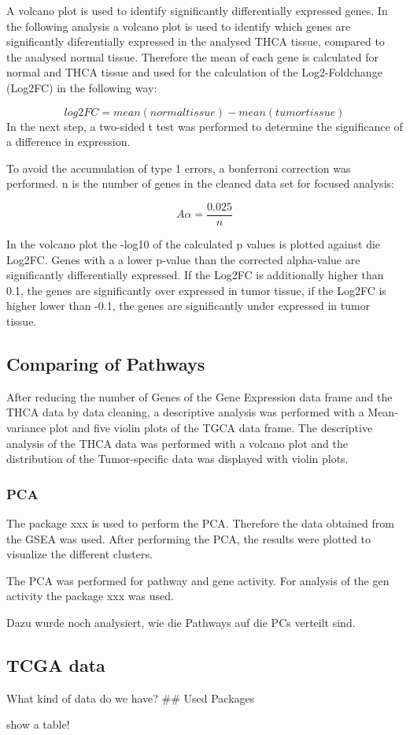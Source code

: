 \documentclass[
]{article}
\begin{document}
A volcano plot is used to identify significantly differentially
expressed genes. In the following analysis a volcano plot is used to
identify which genes are significantly diferentially expressed in the
analysed THCA tissue, compared to the analysed normal tissue. Therefore
the mean of each gene is calculated for normal and THCA tissue and used
for the calculation of the Log2-Foldchange (Log2FC) in the following
way:

\[
log2FC = mean(normal tissue) - mean(tumor tissue)
\] In the next step, a two-sided t test was performed to determine the
significance of a difference in expression.

To avoid the accumulation of type 1 errors, a bonferroni correction was
performed. n is the number of genes in the cleaned data set for focused
analysis:

\[
A \alpha = \frac{0.025}{n}
\]

In the volcano plot the -log10 of the calculated p values is plotted
against die Log2FC. Genes with a a lower p-value than the corrected
alpha-value are significantly differentially expressed. If the Log2FC is
additionally higher than 0.1, the genes are significantly over expressed
in tumor tissue, if the Log2FC is higher lower than -0.1, the genes are
significantly under expressed in tumor tissue.

\hypertarget{comparing-of-pathways}{%
\subsection{Comparing of Pathways}\label{comparing-of-pathways}}

After reducing the number of Genes of the Gene Expression data frame and
the THCA data by data cleaning, a descriptive analysis was performed
with a Mean-variance plot and five violin plots of the TGCA data frame.
The descriptive analysis of the THCA data was performed with a volcano
plot and the distribution of the Tumor-specific data was displayed with
violin plots.

\hypertarget{pca}{%
\subsubsection{PCA}\label{pca}}

The package xxx is used to perform the PCA. Therefore the data obtained
from the GSEA was used. After performing the PCA, the results were
plotted to visualize the different clusters.

The PCA was performed for pathway and gene activity. For analysis of the
gen activity the package xxx was used.

Dazu wurde noch analysiert, wie die Pathways auf die PCs verteilt sind.

\hypertarget{tcga-data}{%
\subsection{TCGA data}\label{tcga-data}}

What kind of data do we have? \#\# Used Packages

show a table!
\end{document}
